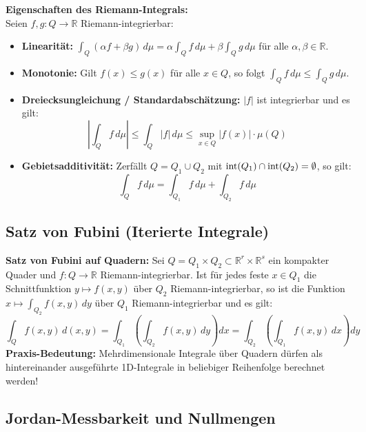 \begin{theorem}
    \textbf{Eigenschaften des Riemann-Integrals:} \\
    Seien $f, g: Q \to \mathbb{R}$ Riemann-integrierbar:
    \begin{itemize}
        \item \textbf{Linearität:} $\int_Q (\alpha f + \beta g) \, d\mu = \alpha \int_Q f \, d\mu + \beta \int_Q g \, d\mu$ für alle $\alpha, \beta \in \mathbb{R}$.
        \item \textbf{Monotonie:} Gilt $f(x) \le g(x)$ für alle $x \in Q$, so folgt $\int_Q f \, d\mu \le \int_Q g \, d\mu$.
        \item \textbf{Dreiecksungleichung / Standardabschätzung:} $|f|$ ist integrierbar und es gilt:
        $$ \left| \int_Q f \, d\mu \right| \le \int_Q |f| \, d\mu \le \sup_{x \in Q} |f(x)| \cdot \mu(Q) $$
        \item \textbf{Gebietsadditivität:} Zerfällt $Q = Q_1 \cup Q_2$ mit $\operatorname{int}(Q_1) \cap \operatorname{int}(Q_2) = \emptyset$, so gilt:
        $$ \int_Q f \, d\mu = \int_{Q_1} f \, d\mu + \int_{Q_2} f \, d\mu $$
    \end{itemize}
\end{theorem}

\subsection{Satz von Fubini (Iterierte Integrale)}

\begin{theorem}
    \textbf{Satz von Fubini auf Quadern:}
    Sei $Q = Q_1 \times Q_2 \subset \mathbb{R}^r \times \mathbb{R}^s$ ein kompakter Quader und $f: Q \to \mathbb{R}$ Riemann-integrierbar.
    Ist für jedes feste $x \in Q_1$ die Schnittfunktion $y \mapsto f(x, y)$ über $Q_2$ Riemann-integrierbar, so ist die Funktion $x \mapsto \int_{Q_2} f(x, y) \, dy$ über $Q_1$ Riemann-integrierbar und es gilt:
    $$ \int_Q f(x, y) \, d(x, y) = \int_{Q_1} \left( \int_{Q_2} f(x, y) \, dy \right) dx = \int_{Q_2} \left( \int_{Q_1} f(x, y) \, dx \right) dy $$
    \textbf{Praxis-Bedeutung:} Mehrdimensionale Integrale über Quadern dürfen als hintereinander ausgeführte 1D-Integrale in beliebiger Reihenfolge berechnet werden!
\end{theorem}

\subsection{Jordan-Messbarkeit und Nullmengen}


